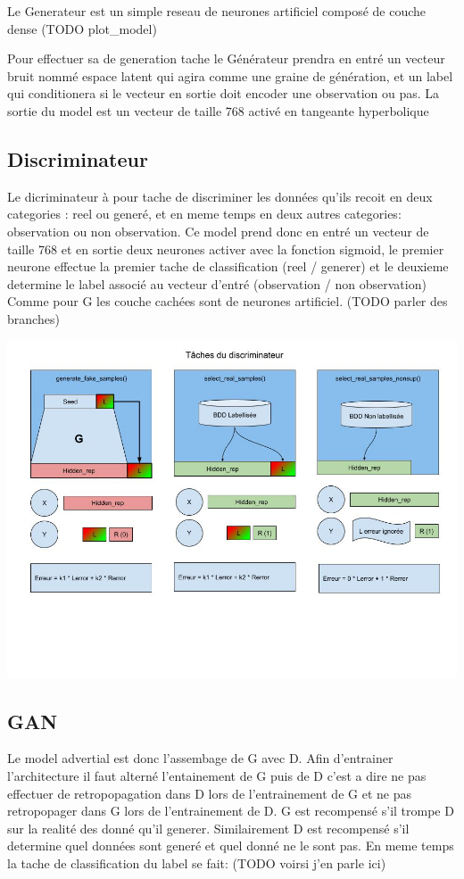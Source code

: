 \documentclass[francais,a4paper]{llncs} %
\begin{document}
	Le Generateur est un simple reseau de neurones artificiel composé de couche dense (TODO plot\_model)

	Pour effectuer sa de generation tache le Générateur prendra en entré un vecteur bruit nommé espace latent qui agira comme une graine de génération, et un label qui conditionera si le vecteur en sortie doit encoder une observation ou pas.
	La sortie du model est un vecteur de taille 768 activé en tangeante hyperbolique
	
	\subsection{Discriminateur}

	Le dicriminateur à pour tache de discriminer les données qu'ils recoit en deux categories : reel ou generé, et en meme temps en deux autres categories: observation ou non observation.
	Ce model prend donc en entré un vecteur de taille 768 et en sortie deux neurones activer avec la fonction sigmoid, le premier neurone effectue la premier tache de classification (reel / generer) et le deuxieme determine le label associé au vecteur d'entré (observation / non observation)
	Comme pour G les couche cachées sont de neurones artificiel.
	(TODO parler des branches)

	\includegraphics[width=\textwidth]{tacheD.jpg}

	\subsection{GAN}

	Le model advertial est donc l'assembage de G avec D.
	Afin d'entrainer l'architecture il faut alterné l'entainement de G puis de D c'est a dire ne pas effectuer de retropopagation dans D lors de l'entrainement de G et ne pas retropopager dans G lors de l'entrainement de D.
	G est recompensé s'il trompe D sur la realité des donné qu'il generer. Similairement D est recompensé s'il determine quel données sont generé et quel donné ne le sont pas.
	En meme temps la tache de classification du label se fait: (TODO voirsi j'en parle ici)
\end{document}
